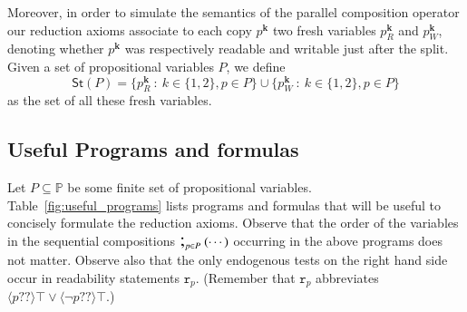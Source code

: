 \documentclass{llncs}
\newcommand{\cp}[2]{{#2}^\mathbf{#1}}
\newcommand{\cpr}[2]{\cp{#1}{#2}_R}
\newcommand{\cpw}[2]{\cp{#1}{#2}_W}
\newcommand{\readable}[1]{\mathtt{r}_{#1}}
\newcommand{\testendo}{?\!\!?}			%
\newcommand{\storeset}{\mathsf{St}}
\newcommand{\ldia}[1]{ \big\langle #1 \big\rangle}
\newcommand{\propset}{\mathbb P}
\newcommand{\seqseq}[1]{ \text{\Large ;}_{#1} ~ }
\newcommand{\set}[1]{\{#1\}}
\newcommand{\suchthat}{~ : ~}
\begin{document}
Moreover, in order to simulate the semantics of the parallel composition operator our reduction axioms associate to each copy $\cp k p$ two fresh variables $\cpr k p$ and $\cpw k p$,
denoting whether $\cp k p$ was respectively readable and writable just after the split.
Given a set of propositional variables $P$, we define 
$$\storeset(P) =
\set{ \cpr k p \suchthat k \in \set{1,2}, p \in P} \cup
\set{ \cpw k p \suchthat k \in \set{1,2}, p \in P}$$ 
as the set of all these fresh variables.


\subsection{Useful Programs and formulas}\label{sec:usefulFml}

Let $P \subseteq \propset$ be some finite set of propositional variables. 
Table~\ref{fig:useful_programs} lists programs and formulas that will be useful to concisely formulate the reduction axioms.
%
Observe that the order of the variables in the sequential compositions $ \seqseq{p \in P} ( \cdots ) $ occurring in the above programs does not matter. 
Observe also that the only endogenous tests on the right hand side occur in readability statements $\readable p$. 
(Remember that $\readable p$ abbreviates $\ldia{ p \testendo} \top \lor \ldia{ \lnot p \testendo} \top $.)
\end{document}
